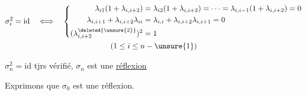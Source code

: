 \[
\begin{gathered}
\sigma_i^2=\mathrm{id}\quad\Longleftrightarrow\quad\left\{\begin{aligned}
\lambda_{i1}(1+\lambda_{i,i+2})&=\lambda_{i2}(1+\lambda_{i,i+2})=\cdots=\lambda_{i,i-1}(1+\lambda_{i,i+2})=0\\
\lambda_{i,i+1}+\lambda_{i,i+2}\lambda_{ii}&=\lambda_{i,i}+\lambda_{i,i+2}\lambda_{i,i+1}=0\\
(\lambda_{i,i+2}^{\deleted{\unsure{2}}})^2&=1
\end{aligned}\right.\\
(1\leq i\leq n-\unsure{1})
\end{gathered}
\]

$\sigma_n^2=\mathrm{id}$ tjrs vérifié, $\sigma_n$ est une \uline{réflexion}

Exprimons que $\sigma_0$ est une réflexion.

